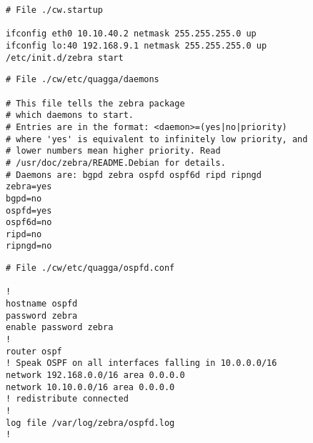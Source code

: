 \begin{lstlisting}[frame=single,caption=Example node startup configuration,captionpos=b,label=listlab3startup]
# File ./cw.startup

ifconfig eth0 10.10.40.2 netmask 255.255.255.0 up
ifconfig lo:40 192.168.9.1 netmask 255.255.255.0 up
/etc/init.d/zebra start
\end{lstlisting}

\begin{lstlisting}[frame=single,caption=Example node's \texttt{daemons} file for enabling Quagga routing protocols,captionpos=b,label=listlab3daemons]
# File ./cw/etc/quagga/daemons

# This file tells the zebra package
# which daemons to start.
# Entries are in the format: <daemon>=(yes|no|priority)
# where 'yes' is equivalent to infinitely low priority, and
# lower numbers mean higher priority. Read
# /usr/doc/zebra/README.Debian for details.
# Daemons are: bgpd zebra ospfd ospf6d ripd ripngd
zebra=yes
bgpd=no
ospfd=yes
ospf6d=no
ripd=no
ripngd=no
\end{lstlisting}

\begin{lstlisting}[frame=single,caption=Example node's configuration of Quagga's OSPF daemon,captionpos=b,label=listlab3quagga]
# File ./cw/etc/quagga/ospfd.conf

!
hostname ospfd
password zebra
enable password zebra
!
router ospf
! Speak OSPF on all interfaces falling in 10.0.0.0/16
network 192.168.0.0/16 area 0.0.0.0
network 10.10.0.0/16 area 0.0.0.0
! redistribute connected
!
log file /var/log/zebra/ospfd.log
!
\end{lstlisting}

